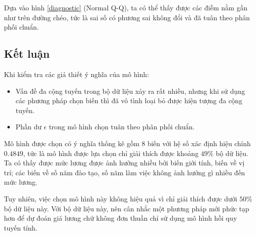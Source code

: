Dựa vào hình \ref{diagnostic} (Normal Q-Q), ta có thể thấy được các điễm nằm gần như trên đường chéo, tức là sai số có phương sai không đổi và đã tuân theo phân phối chuẩn.

\subsection*{Kết luận}
Khi kiểm tra các giả thiết ý nghĩa của mô hình:
\begin{itemize}
	\item Vấn đề đa cộng tuyến trong bộ dữ liệu xảy ra rất nhiều, nhưng khi sử dụng các phương pháp chọn biến thì đã vô tình loại bỏ được hiện tượng đa cộng tuyến.
	\item Phần dư $\epsilon$ trong mô hình chọn tuân theo phân phối chuẩn.
\end{itemize}
Mô hình được chọn có ý nghĩa thống kê gồm 8 biến với hệ số xác định hiệu chỉnh $0.4849$, tức là mô hình được lựa chọn chỉ giải thích được khoảng $49\%$ bộ dữ liệu. Ta có thấy được mức lương được ảnh hưởng nhiều bởi biến giới tính, biến về vị trí; các biến về số năm đào tạo, số năm làm việc không ảnh hưởng gì nhiều đến mức lương.

Tuy nhiên, việc chọn mô hình này không hiệu quả vì chỉ giải thích được dưới $50\%$ bộ dữ liệu này. Với bộ dữ liệu này, nên cân nhắc một phương pháp mới phức tạp hơn để dự đoán giá lương chứ không đơn thuần chỉ sử dụng mô hình hồi quy tuyến tính.
